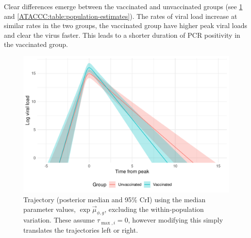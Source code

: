 \documentclass[thesis.tex]{subfiles}
\begin{document}
Clear differences emerge between the vaccinated and unvaccinated groups (see \cref{ATACCC:fig:median-trajectories} and \cref{ATACCC:table:population-estimates}).
The rates of viral load increase at similar rates in the two groups, the vaccinated group have higher peak viral loads and clear the virus faster.
This leads to a shorter duration of PCR positivity in the vaccinated group.
\begin{figure}
  \centering \includegraphics{ATACCC/mean_trajectories}
  \caption[Median viral load trajectories]{Trajectory (posterior median and 95\% CrI) using the median parameter values, $\exp \vec{\mu}_{\phi,g}$, excluding the within-population variation. These assume $\tau_{\max,i}=0$, however modifying this simply translates the trajectories left or right. \label{ATACCC:fig:median-trajectories}}
\end{figure}
\begin{table}
  \caption{Population-level estimates of the viral load parameters (posterior medians and 95\% CrI). The vaccinated population have higher peak viral loads but clear the virus faster. \label{ATACCC:table:population-estimates}}
\end{table}
\end{document}
